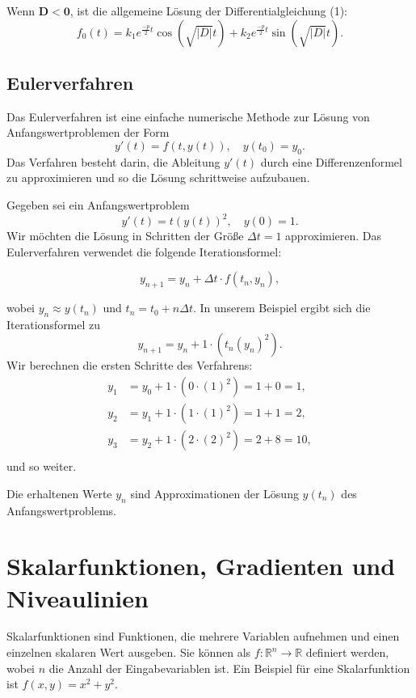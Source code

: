 \documentclass[11pt, openany]{book}
\begin{document}
\begin{tcolorbox}
    Wenn $\mathbf{D < 0}$, ist die allgemeine Lösung der Differentialgleichung (1):
    \[
        f_0(t) = k_1 e^{\frac{-p}{2} t} \cos(\sqrt{\lvert D \rvert} t) + k_2 e^{\frac{-p}{2} t} \sin(\sqrt{\lvert D \rvert} t).
    \]
\end{tcolorbox}
\newpage

\subsection{Eulerverfahren}
Das Eulerverfahren ist eine einfache numerische Methode zur Lösung von Anfangswertproblemen der Form
\[
y'(t) = f(t, y(t)), \quad y(t_0) = y_0.
\]
Das Verfahren besteht darin, die Ableitung $y'(t)$ durch eine Differenzenformel zu approximieren und so die Lösung schrittweise aufzubauen.

Gegeben sei ein Anfangswertproblem
\[
y'(t) = t (y(t))^2, \quad y(0) = 1.
\]
Wir möchten die Lösung in Schritten der Größe $\Delta t = 1$ approximieren. Das Eulerverfahren verwendet die folgende Iterationsformel:
\begin{tcolorbox}
\[
y_{n+1} = y_n + \Delta t \cdot f(t_n, y_n),
\]    
\end{tcolorbox}

wobei $y_n \approx y(t_n)$ und $t_n = t_0 + n \Delta t$. In unserem Beispiel ergibt sich die Iterationsformel zu
\[
y_{n+1} = y_n + 1 \cdot (t_n (y_n)^2).
\]
Wir berechnen die ersten Schritte des Verfahrens:
\begin{align*}
y_1 &= y_0 + 1 \cdot (0 \cdot (1)^2) = 1 + 0 = 1, \\
y_2 &= y_1 + 1 \cdot (1 \cdot (1)^2) = 1 + 1 = 2, \\
y_3 &= y_2 + 1 \cdot (2 \cdot (2)^2) = 2 + 8 = 10, \\
\end{align*}
und so weiter.

Die erhaltenen Werte $y_n$ sind Approximationen der Lösung $y(t_n)$ des Anfangswertproblems.
\vspace{1cm}

\section{Skalarfunktionen, Gradienten und Niveaulinien}

Skalarfunktionen sind Funktionen, die mehrere Variablen aufnehmen und einen einzelnen skalaren Wert ausgeben. Sie können als $f: \mathbb{R}^n \to \mathbb{R}$ definiert werden, wobei $n$ die Anzahl der Eingabevariablen ist. Ein Beispiel für eine Skalarfunktion ist $f(x, y) = x^2 + y^2$.
\end{document}
